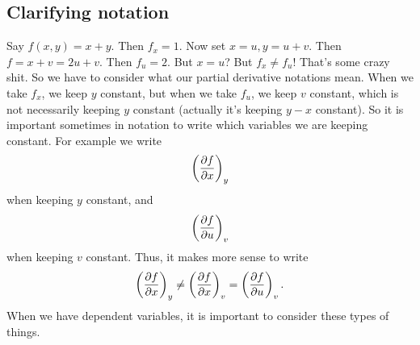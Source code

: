 \subsection{Clarifying notation} 
Say $f(x,y)=x+y$. Then $f_x = 1$. Now set $x=u,y=u+v$. Then $f=x+v=2u+v$. Then $f_u = 2$. But $x=u$? But $f_x \ne f_u$! That's some crazy shit. So we have to consider what our partial derivative notations mean. When we take $f_x$, we keep $y$ constant, but when we take $f_u$, we keep $v$ constant, which is not necessarily keeping $y$ constant (actually it's keeping $y-x$ constant). So it is important sometimes in notation to write which variables we are keeping constant. For example we write
\[ \left(\frac{\partial f}{\partial x}\right)_y \]
when keeping $y$ constant, and
\[ \left(\frac{\partial f}{\partial u}\right)_v \]
when keeping $v$ constant. Thus, it makes more sense to write
\[ \left(\frac{\partial f}{\partial x}\right)_y \ne \left(\frac{\partial f}{\partial x}\right)_v = \left(\frac{\partial f}{\partial u}\right)_v. \]
When we have dependent variables, it is important to consider these types of things. 

